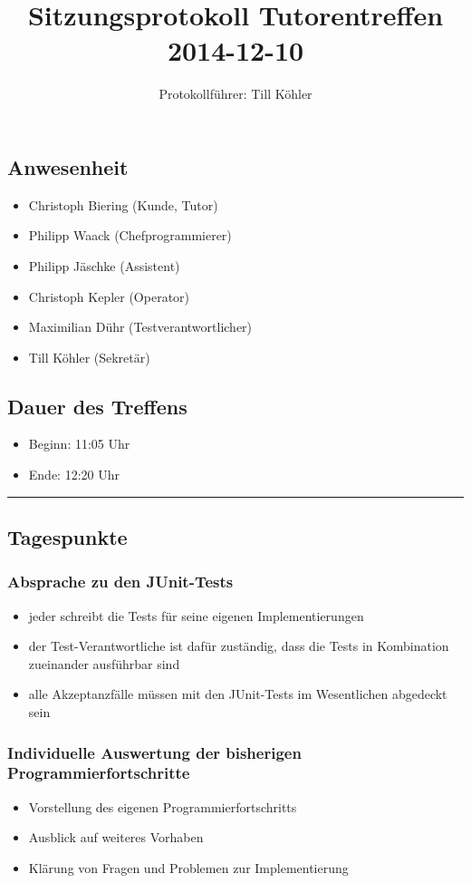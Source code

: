 \documentclass[12pt,a4paper]{article}
\author{Protokollführer: Till Köhler}
\title{Sitzungsprotokoll Tutorentreffen 2014-12-10}
\date{}
\begin{document}
\maketitle

\subsection*{Anwesenheit}
\medskip
\begin{itemize}
\item Christoph Biering (Kunde, Tutor)
\item Philipp Waack (Chefprogrammierer)
\item Philipp Jäschke (Assistent)
\item Christoph Kepler (Operator)
\item Maximilian Dühr (Testverantwortlicher)
\item Till Köhler (Sekretär)
\end{itemize}

\subsection*{Dauer des Treffens}
\medskip
\begin{itemize}
\item Beginn: 11:05 Uhr
\item Ende: 12:20 Uhr
\end{itemize}

\noindent\rule{\textwidth}{1pt}

\subsection*{Tagespunkte}
\medskip

\subsubsection*{Absprache zu den JUnit-Tests}
\begin{itemize}
\item jeder schreibt die Tests für seine eigenen Implementierungen
\item der Test-Verantwortliche ist dafür zuständig, dass die Tests in Kombination zueinander ausführbar sind
\item alle Akzeptanzfälle müssen mit den JUnit-Tests im Wesentlichen abgedeckt sein
\end{itemize}

\subsubsection*{Individuelle Auswertung der bisherigen Programmierfortschritte}
\begin{itemize}
\item Vorstellung des eigenen Programmierfortschritts
\item Ausblick auf weiteres Vorhaben
\item Klärung von Fragen und Problemen zur Implementierung
\end{itemize}
\end{document}
